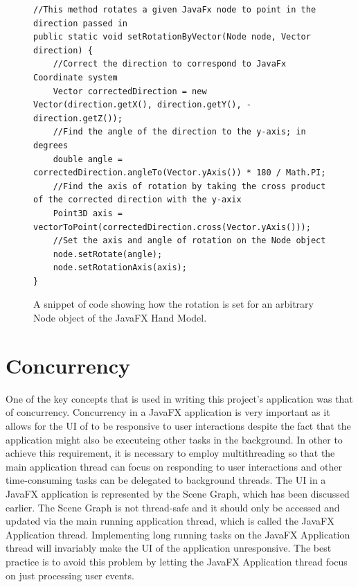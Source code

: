 \begin{figure}[th]
\centering
\begin{lstlisting}
//This method rotates a given JavaFx node to point in the direction passed in
public static void setRotationByVector(Node node, Vector direction) {
	//Correct the direction to correspond to JavaFx Coordinate system
	Vector correctedDirection = new Vector(direction.getX(), direction.getY(), -direction.getZ());
	//Find the angle of the direction to the y-axis; in degrees
	double angle = correctedDirection.angleTo(Vector.yAxis()) * 180 / Math.PI;
	//Find the axis of rotation by taking the cross product of the corrected direction with the y-axix
	Point3D axis = vectorToPoint(correctedDirection.cross(Vector.yAxis()));
	//Set the axis and angle of rotation on the Node object
	node.setRotate(angle);
	node.setRotationAxis(axis);
}
\end{lstlisting}
\caption[setRotationByVector Method]{A snippet of code showing how the rotation is set for an arbitrary Node object of the JavaFX Hand Model.}
\label{fig:setRotationByVectorCode}
\end{figure}




\section{Concurrency}
One of the key concepts that is used in writing this project's application was that of concurrency. Concurrency in a JavaFX application is very important as it allows for the UI of to be responsive to user interactions despite the fact that the application might also be executeing other tasks in the background. In other to achieve this requirement, it is necessary to employ multithreading so that the main application thread can focus on responding to user interactions and other time-consuming tasks can be delegated to background threads. The UI in a JavaFX application is represented by the Scene Graph, which has been discussed earlier. The Scene Graph is not thread-safe and it should only be accessed and updated via the main running application thread, which is called the JavaFX Application thread. Implementing long running tasks on the JavaFX Application thread will invariably make the UI of the application unresponsive. The best practice is to avoid this problem by letting the JavaFX Application thread focus on just processing user events. 


